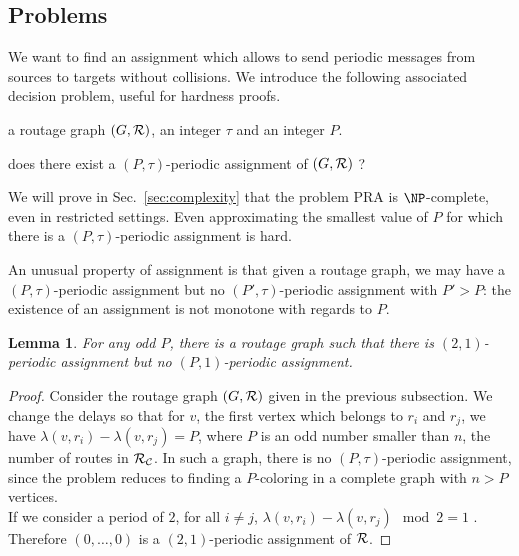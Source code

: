 \documentclass[a4paper,10pt]{article}
\newtheorem{lemma}[theorem]{Lemma}
\begin{document}
   \subsection{Problems}\label{nonmonotone}

    We want to find an assignment which allows to send periodic messages from sources to targets
    without collisions. We introduce the following associated decision problem, useful for hardness proofs.
    


       a routage graph $(G,\cal R)$, an integer $\tau$ and an integer $P$.

       does there exist a $(P,\tau)$-periodic assignment of $(G,\cal R)$ ?


      We will prove in Sec.~\ref{sec:complexity} that the problem PRA is $\NP$-complete, even in restricted settings.
      Even approximating the smallest value of $P$ for which there is a $(P,\tau)$-periodic assignment is hard.
      
      An unusual property of assignment is that given a routage graph, we may have a $(P,\tau)$-periodic assignment but no
      $(P',\tau)$-periodic assignment with $P' > P$: the existence of an assignment is not monotone with regards to $P$.

	\begin{lemma} \label{lemma:monotonic}
	 For any odd $P$, there is a routage graph such that there is $(2,1)$-periodic assignment but no $(P,1)$-periodic assignment.
	\end{lemma}
\begin{proof}

      Consider the routage graph $(G,{\cal R})$ given in the previous subsection. 
      We change the delays so that for $v$, the first vertex which belongs to $r_i$ and $r_j$,
      we have $\lambda(v,r_i) - \lambda(v,r_j)= P$, where $P$ is an odd number smaller than $n$, the number of routes in ${\cal R_{\cal C}}$. In such a graph, there is no $(P,\tau)$-periodic assignment, since the problem reduces to finding a $P$-coloring in a complete graph with $n > P$ vertices.\\
      If we consider a period of $2$, for all $i \neq j$, $\lambda(v,r_i) - \lambda(v,r_j) \mod 2 = 1$ . Therefore $(0,\dots,0)$ is a $(2,1)$-periodic assignment of ${\cal R}$.

      
\end{proof}
      
\end{document}
